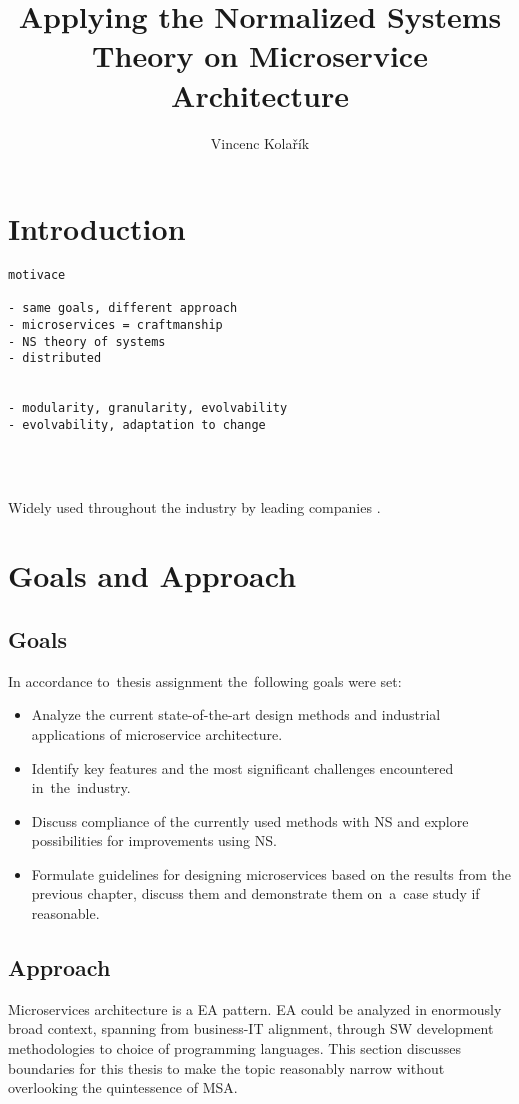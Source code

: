 \documentclass[thesis=M,english,hidelinks]{FITthesis}[2012/10/20]
\title{Applying the Normalized Systems Theory on Microservice Architecture}
\author{Vincenc Kolařík} %
\begin{document}
% 
% 
\chapter{Introduction}
\begin{verbatim}
motivace

- same goals, different approach
- microservices = craftmanship
- NS theory of systems
- distributed 


- modularity, granularity, evolvability
- evolvability, adaptation to change
    
    
    
\end{verbatim}

Widely used throughout the industry by leading companies \cite{ms-who-is-using}.


% 
% 
\chapter{Goals and Approach}
\section{Goals}
In accordance to~thesis assignment the~following goals were set:
\begin{itemize}
	\item Analyze the current state-of-the-art design methods and industrial applications of microservice architecture.
	\item Identify key features and the most significant challenges encountered in~the~industry.
	\item Discuss compliance of the currently used methods with \acrlong{NS} and explore possibilities for improvements using \acrshort{NS}. 
	\item Formulate guidelines for designing microservices based on the results from the previous chapter, discuss them and demonstrate them on~a~case study if reasonable.
\end{itemize}

\section{Approach}
Microservices architecture is a \acrfull{EA} pattern. \acrshort{EA} could be analyzed in enormously broad context, spanning from business-IT alignment, through \acrshort{SW} development methodologies to choice of programming languages. This section discusses boundaries for this thesis to make the topic reasonably narrow without overlooking the quintessence of \acrlong{MSA}.
\end{document}

